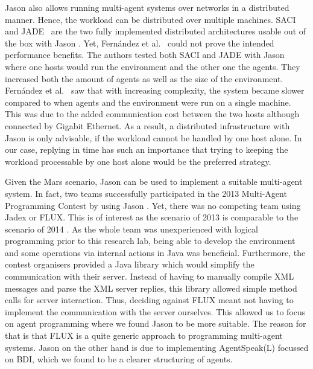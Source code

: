 Jason also allows running multi-agent systems over networks in a distributed manner. Hence, the workload can be distributed over multiple machines. SACI~\cite{hubner_saci_2000} and JADE~\cite{bellifemine_jade_2005} are the two fully implemented distributed architectures usable out of the box with Jason \cite{bordini_programming_2007}. Yet, Fernández et al.~\cite{fernandez_evaluating_2010} could not prove the intended performance benefits. The authors tested both SACI and JADE with Jason where one hosts would run the environment and the other one the agents. They increased both the amount of agents as well as the size of the environment. Fernández et al.~\cite{fernandez_evaluating_2010} saw that with increasing complexity, the system became slower compared to when agents and the environment were run on a single machine. This was due to the added communication cost between the two hosts although connected by Gigabit Ethernet. As a result, a distributed infrastructure with Jason is only advisable, if the workload cannot be handled by one host alone. In our case, replying in time has such an importance that trying to keeping the workload processable by one host alone would be the preferred strategy.

Given the Mars scenario, Jason can be used to implement a suitable multi-agent system. In fact, two teams successfully participated in the 2013 Multi-Agent Programming Contest by using Jason \cite{ahlbrecht_multi_2013}.%
Yet, there was no competing team using Jadex or FLUX.
This is of interest as the scenario of 2013 is comparable to the scenario of 2014 \cite{ahlbrecht_mapc_2014}. %
As the whole team was unexperienced with logical programming prior to this research lab, being able to develop the environment and some operations via internal actions in Java was beneficial. Furthermore, the contest organisers provided a Java library which would simplify the communication with their server. Instead of having to manually compile XML messages and parse the XML server replies, this library allowed simple method calls for server interaction. Thus, deciding against FLUX meant not having to implement the communication with the server ourselves. This allowed us to focus on agent programming where we found Jason to be more suitable. The reason for that is that FLUX is a quite generic approach to programming multi-agent systems. Jason on the other hand is due to implementing AgentSpeak(L) focussed on BDI, which we found to be a clearer structuring of agents. %
